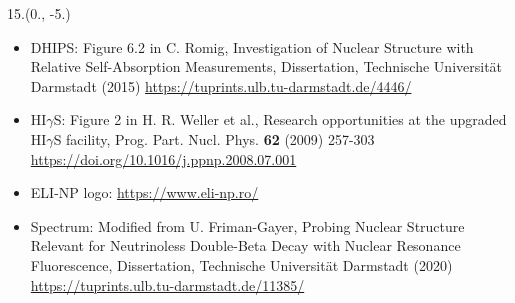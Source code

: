 \begin{textblock}{15.}(0., -5.)
    \begin{itemize}
        \item DHIPS: Figure 6.2 in C. Romig, Investigation of Nuclear Structure with Relative Self-Absorption Measurements, Dissertation, Technische Universit\"at Darmstadt (2015) \url{https://tuprints.ulb.tu-darmstadt.de/4446/}
        \item HI$\gamma$S: Figure 2 in H. R. Weller et al., Research opportunities at the upgraded HI$\gamma$S facility, Prog. Part. Nucl. Phys. \textbf{62} (2009) 257-303 \url{https://doi.org/10.1016/j.ppnp.2008.07.001}
        \item ELI-NP logo: \url{https://www.eli-np.ro/}
        \item Spectrum: Modified from U. Friman-Gayer, Probing Nuclear Structure Relevant for Neutrinoless Double-Beta Decay with Nuclear Resonance Fluorescence, Dissertation, Technische Universit\"at Darmstadt (2020) \url{https://tuprints.ulb.tu-darmstadt.de/11385/}
    \end{itemize}
\end{textblock}